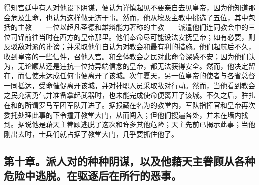 得知宫廷中有人对他设下阴谋，便认为谨慎起见不要亲自去见皇帝，因为他知道那会危及生命，也认为这样做无济于事。然而，他从埃及主教中挑选了五位，其中包括的主教——一位以超凡圣德和雄辩能力著称的主教——派遣他们连同教会中的三位司铎前往当时在西方的皇帝那里。他们奉命尽可能设法安抚皇帝；如有必要，则反驳敌对派的诽谤；并采取他们自认为对教会和最有利的措施。他们起航后不久，收到皇帝的一些信件，召他入宫。和全体教会之民对此命令深感不安；因为他们认为，无论顺从还是违抗一位持异端信念的皇帝，都无法获得安全。然而，他决定留在，而信使未达成任何事便离开了该城。次年夏天，另一位皇帝的使者与各省总督一同抵达，受命催促离开该城，并对神职人员采取敌对行动。然而，当他看到教会之民充满勇气并准备拿起武器时，也未能完成使命便离开了该城。不久之后，驻扎在和的所谓罗马军团军队开进了。据报藏在名为的教堂内，军队指挥官和皇帝再次委托处理此事的下令撞开教堂大门，从而闯入；但他们搜遍各处，并未在墙内找到。据说他是藉天主眷顾逃脱了这次和许多其他危险；天主先前已揭示此事；当他刚出去时，士兵们就占据了教堂大门，几乎要抓住他了。\par


\subsection{第十章。派人对的种种阴谋，以及他藉天主眷顾从各种危险中逃脱。在驱逐后在所行的恶事。}

